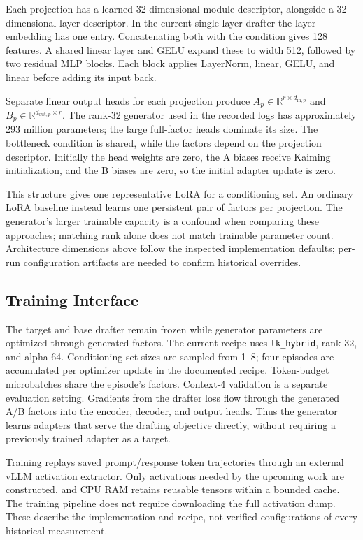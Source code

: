 Each projection has a learned 32-dimensional module descriptor, alongside a
32-dimensional layer descriptor. In the current single-layer drafter the layer
embedding has one entry. Concatenating both with the condition gives 128
features. A shared linear layer and GELU expand these to width 512, followed by
two residual MLP blocks. Each block applies LayerNorm, linear, GELU, and linear
before adding its input back.

Separate linear output heads for each projection produce
$A_p\in\mathbb{R}^{r\times d_{\mathrm{in},p}}$ and
$B_p\in\mathbb{R}^{d_{\mathrm{out},p}\times r}$.
The rank-32 generator used in the recorded logs has approximately 293 million
parameters; the large full-factor heads dominate its size. The bottleneck
condition is shared, while the factors depend on the projection descriptor.
Initially the head weights are zero, the A biases receive Kaiming initialization,
and the B biases are zero, so the initial adapter update is zero.

This structure gives one representative LoRA for a conditioning set. An ordinary
LoRA baseline instead learns one persistent pair of factors per projection.
The generator's larger trainable capacity is a confound when comparing these
approaches; matching rank alone does not match trainable parameter count.
Architecture dimensions above follow the inspected implementation defaults;
per-run configuration artifacts are needed to confirm historical overrides.

\subsection{Training Interface}
The target and base drafter remain frozen while generator parameters are
optimized through generated factors. The current recipe uses
\texttt{lk\_hybrid}, rank 32, and alpha 64. Conditioning-set sizes are sampled
from 1--8; four episodes are accumulated per optimizer update in the documented
recipe. Token-budget microbatches share the episode's factors. Context-4
validation is a separate evaluation setting. Gradients from the drafter loss
flow through the generated A/B factors into the encoder, decoder, and output
heads. Thus the generator learns adapters that serve the drafting objective
directly, without requiring a previously trained adapter as a target.

Training replays saved prompt/response token trajectories through an external
vLLM activation extractor. Only activations needed by the upcoming work are
constructed, and CPU RAM retains reusable tensors within a bounded cache.
The training pipeline does not require downloading the full activation dump.
These describe the implementation and recipe, not verified configurations of
every historical measurement.

